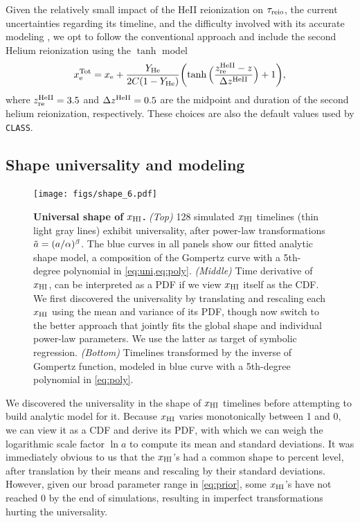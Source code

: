 Given the relatively small impact of the HeII reionization on
$\tau_{\mathrm{reio}}$, the current uncertainties regarding its timeline, and the
difficulty involved with its accurate modeling \cite{Hotinli2023,
Upton2020}, we opt to follow the conventional approach and include the
second Helium reionization using the $\tanh$ model
%
\begin{equation}
\label{eq:xe_tot}
x_{\mathrm{e}}^\mathrm{Tot} = x_{\mathrm{e}} + \frac{Y_{\mathrm{He}}}{2C(1 - Y_{\mathrm{He}})}
  \biggl(\tanh{\Bigl(\frac{z_{\mathrm{re}}^{\mathrm{HeII}}- z}{\Delta z^{\mathrm{HeII}}}\Bigr)} + 1\biggr),
\end{equation}
%
where $z_{\mathrm{re}}^{\mathrm{HeII}} = 3.5$ and $\Delta z^{\mathrm{HeII}} = 0.5$ are the midpoint
and duration of the second helium reionization, respectively.
These choices are also the default values used by \texttt{CLASS}.


\subsection*{Shape universality and modeling}
\label{ssec:shape}

\begin{figure}[tb]
\centering
\texttt{[image: figs/shape\_6.pdf]}
\caption{\textbf{Universal shape of $x_{\mathrm{HI}}$.}
\emph{(Top)} 128 simulated $x_{\mathrm{HI}}$ timelines (thin light gray lines)
exhibit universality, after power-law transformations $\tilde{a} =
(a/\alpha)^\beta$.
The blue curves in all panels show our fitted analytic shape model, a
composition of the Gompertz curve with a 5th-degree polynomial in
\cref{eq:uni,eq:poly}.
\emph{(Middle)} Time derivative of $x_{\mathrm{HI}}$, can be interpreted as a PDF
if we view $x_{\mathrm{HI}}$ itself as the CDF.
We first discovered the universality by translating and rescaling each
$x_{\mathrm{HI}}$ using the mean and variance of its PDF, though now switch to the
better approach that jointly fits the global shape and individual
power-law parameters.
We use the latter as target of symbolic regression.
\emph{(Bottom)} Timelines transformed by the inverse of Gompertz
function, modeled in blue curve with a 5th-degree polynomial in
\cref{eq:poly}.}
\label{fig:shape}
\end{figure}

We discovered the universality in the shape of $x_{\mathrm{HI}}$ timelines before
attempting to build analytic model for it.
Because $x_{\mathrm{HI}}$ varies monotonically between 1 and 0, we can view it as
a CDF and derive its PDF, with which we can weigh the logarithmic scale
factor $\ln a$ to compute its mean and standard deviations.
It was immediately obvious to us that the $x_{\mathrm{HI}}$'s had a common shape
to percent level, after translation by their means and rescaling by
their standard deviations.
However, given our broad parameter range in \cref{eq:prior}, some
$x_{\mathrm{HI}}$'s have not reached 0 by the end of simulations, resulting in
imperfect transformations hurting the universality.

